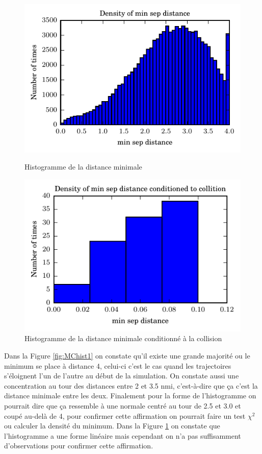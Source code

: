 \documentclass[a4paper, 12pt,twoside]{article}
\numberwithin{equation}{subsection}
\newlength{\mylength}
\begin{document}
	\begin{figure}[htbp]
		\centering
		\begin{minipage}[b]{\mylength}
			\includegraphics[width=\textwidth]{Images/Script_5_4}
			\caption{Histogramme de la distance minimale}
			\label{fig:MChist1}
		\end{minipage}
		\hfill
		\begin{minipage}[b]{\mylength}
			\includegraphics[width=\textwidth]{Images/Script_5_3}
			\caption{Histogramme de la distance minimale conditionné à la collision}
			\label{fig:MChist2}
		\end{minipage}
	\end{figure}
	
	Dans la Figure \ref{fig:MChist1} on constate qu'il existe une grande majorité ou le minimum se place à distance 4, celui-ci c'est le cas quand les trajectoires s'éloignent l'un de l'autre au début de la simulation. On constate aussi une concentration au tour des distances entre 2 et 3.5 nmi, c'est-à-dire que ça c'est la distance minimale entre les deux. Finalement pour la forme de l'histogramme on pourrait dire que ça ressemble à une normale centré au tour de 2.5 et 3.0 et coupé au-delà de 4, pour confirmer cette affirmation on pourrait faire un test $\chi^2$ ou  calculer la densité du minimum. Dans la Figure \ref{fig:MChist2} on constate que l'histogramme a une forme linéaire mais cependant on n'a pas suffisamment d'observations pour confirmer cette affirmation.
	
\end{document}
